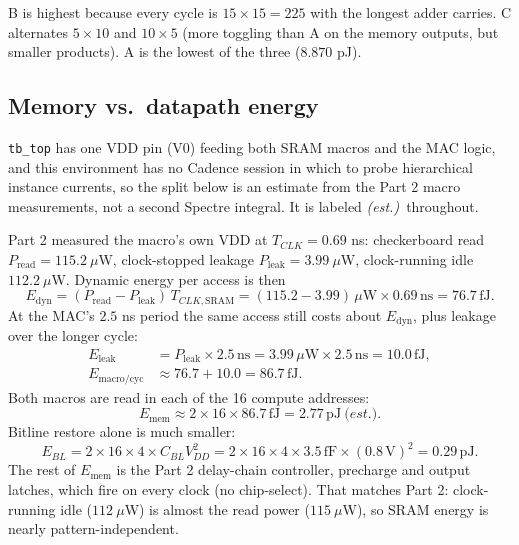 \documentclass[10pt,letterpaper]{article}
\newcommand{\est}{\textit{(est.)}}
\newcommand{\code}[1]{\texttt{#1}}
\begin{document}
B is highest because every cycle is $15\times15=225$ with the longest adder carries. C alternates $5\times10$ and $10\times5$ (more toggling than A on the memory outputs, but smaller products). A is the lowest of the three ($8.870$ pJ).

\subsection{Memory vs.\ datapath energy}\label{sec:memenergy}
\code{tb\_top} has one VDD pin (V0) feeding both SRAM macros and the MAC logic, and this environment has no Cadence session in which to probe hierarchical instance currents, so the split below is an estimate from the Part 2 macro measurements, not a second Spectre integral. It is labeled \est\ throughout.

Part 2 measured the macro's own VDD at $T_{CLK}=0.69$ ns: checkerboard read $P_{\mathrm{read}}=115.2\ \mu$W, clock-stopped leakage $P_{\mathrm{leak}}=3.99\ \mu$W, clock-running idle $112.2\ \mu$W. Dynamic energy per access is then
\[
E_{\mathrm{dyn}}=(P_{\mathrm{read}}-P_{\mathrm{leak}})\,T_{CLK,\mathrm{SRAM}}
=(115.2-3.99)\,\mu\mathrm{W}\times0.69\,\mathrm{ns}=76.7\,\mathrm{fJ}.
\]
At the MAC's $2.5$ ns period the same access still costs about $E_{\mathrm{dyn}}$, plus leakage over the longer cycle:
\begin{align*}
E_{\mathrm{leak}}
&=P_{\mathrm{leak}}\times2.5\,\mathrm{ns}
=3.99\,\mu\mathrm{W}\times2.5\,\mathrm{ns}
=10.0\,\mathrm{fJ},\\
E_{\mathrm{macro/cyc}}
&\approx76.7+10.0
=86.7\,\mathrm{fJ}.
\end{align*}
Both macros are read in each of the 16 compute addresses:
\[
E_{\mathrm{mem}}\approx 2\times16\times86.7\,\mathrm{fJ}=2.77\,\mathrm{pJ}\ \est.
\]
Bitline restore alone is much smaller:
\[
E_{BL}
=2\times16\times4\times C_{BL}V_{DD}^{2}
=2\times16\times4\times3.5\,\mathrm{fF}\times(0.8\,\mathrm{V})^{2}
=0.29\,\mathrm{pJ}.
\]
The rest of $E_{\mathrm{mem}}$ is the Part 2 delay-chain controller, precharge and output latches, which fire on every clock (no chip-select). That matches Part 2: clock-running idle ($112\ \mu$W) is almost the read power ($115\ \mu$W), so SRAM energy is nearly pattern-independent.
\end{document}
